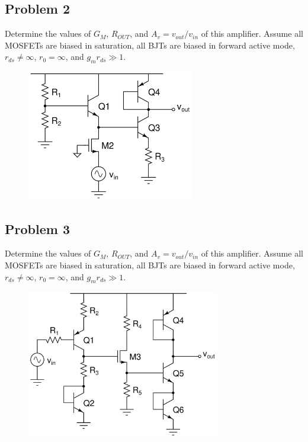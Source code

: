 \documentclass{article}
\begin{document}
\subsection*{Problem 2}
Determine the values of $G_M$, $R_{OUT}$, and $A_v = v_{out}/v_{in}$ of this amplifier.  Assume all MOSFETs are biased in saturation, all BJTs are biased in forward active mode, $r_{ds} \ne \infty$, $r_0 = \infty$, and $g_mr_{ds} \gg 1$.
\begin{figure}[!h]
\begin{center}
    \includegraphics[width=0.65\textwidth]{figures/cc_amp_2.png}
\end{center}
\end{figure}
\newpage
\subsection*{Problem 3}
Determine the values of $G_M$, $R_{OUT}$, and $A_v = v_{out}/v_{in}$ of this amplifier.  Assume all MOSFETs are biased in saturation, all BJTs are biased in forward active mode, $r_{ds} \ne \infty$, $r_0 = \infty$, and $g_mr_{ds} \gg 1$.
\begin{figure}[!h]
\begin{center}
    \includegraphics[width=0.75\textwidth]{figures/cc_amp_3.png}
\end{center}
\end{figure}
\newpage
\end{document}
